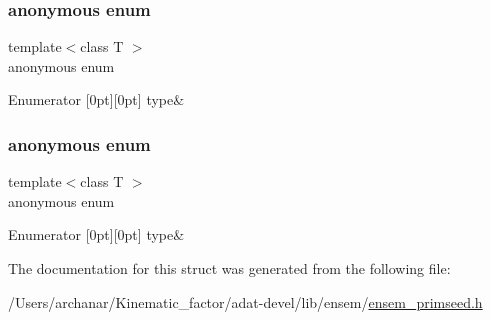 \subsubsection{\texorpdfstring{anonymous enum}{anonymous enum}}
{\footnotesize\ttfamily template$<$class T $>$ \\
anonymous enum}

\begin{DoxyEnumFields}{Enumerator}
[0pt][0pt]{}\mbox{\label{structENSEM_1_1EnsbcIO_3_01PSeed_3_01T_01_4_01_4_a9db5bbad496c77c1e94fb06669321370a1d0ff116fce48938950c1c1cf00d6c59}} 
type&\\
\hline

\end{DoxyEnumFields}
\mbox{\label{structENSEM_1_1EnsbcIO_3_01PSeed_3_01T_01_4_01_4_a9db5bbad496c77c1e94fb06669321370}} 
\subsubsection{\texorpdfstring{anonymous enum}{anonymous enum}}
{\footnotesize\ttfamily template$<$class T $>$ \\
anonymous enum}

\begin{DoxyEnumFields}{Enumerator}
[0pt][0pt]{}\mbox{\label{structENSEM_1_1EnsbcIO_3_01PSeed_3_01T_01_4_01_4_a9db5bbad496c77c1e94fb06669321370a1d0ff116fce48938950c1c1cf00d6c59}} 
type&\\
\hline

\end{DoxyEnumFields}


The documentation for this struct was generated from the following file\+:\begin{DoxyCompactItemize}
\item 
/\+Users/archanar/\+Kinematic\+\_\+factor/adat-\/devel/lib/ensem/\mbox{\hyperlink{adat-devel_2lib_2ensem_2ensem__primseed_8h}{ensem\+\_\+primseed.\+h}}\end{DoxyCompactItemize}
